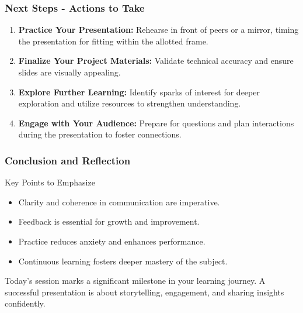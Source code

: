 \documentclass[aspectratio=169]{beamer}
\begin{document}
\begin{frame}[fragile]
    \frametitle{Next Steps - Actions to Take}
    \begin{enumerate}
        \item \textbf{Practice Your Presentation:} Rehearse in front of peers or a mirror, timing the presentation for fitting within the allotted frame.
        \item \textbf{Finalize Your Project Materials:} Validate technical accuracy and ensure slides are visually appealing.
        \item \textbf{Explore Further Learning:} Identify sparks of interest for deeper exploration and utilize resources to strengthen understanding.
        \item \textbf{Engage with Your Audience:} Prepare for questions and plan interactions during the presentation to foster connections.
    \end{enumerate}
\end{frame}

\begin{frame}[fragile]
    \frametitle{Conclusion and Reflection}
    \begin{block}{Key Points to Emphasize}
        \begin{itemize}
            \item Clarity and coherence in communication are imperative.
            \item Feedback is essential for growth and improvement.
            \item Practice reduces anxiety and enhances performance.
            \item Continuous learning fosters deeper mastery of the subject.
        \end{itemize}
    \end{block}
    Today’s session marks a significant milestone in your learning journey. A successful presentation is about storytelling, engagement, and sharing insights confidently.
\end{frame}
\end{document}
